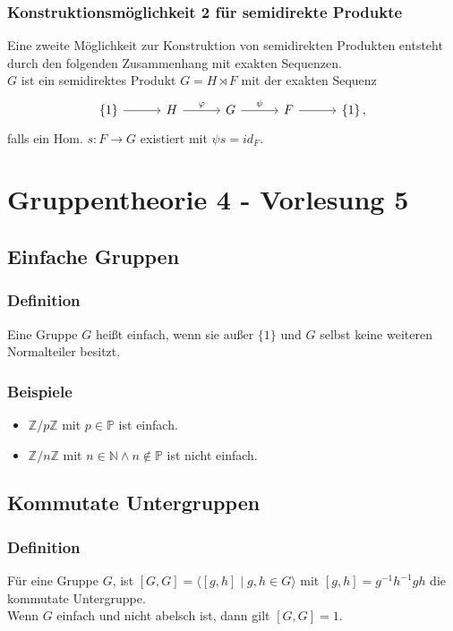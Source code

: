 \documentclass[12pt, german]{article}
\newcommand{\N}{\mathbb{N}}
\begin{document}
	\subsubsection{Konstruktionsmöglichkeit 2 für semidirekte Produkte}
	Eine zweite Möglichkeit zur Konstruktion von semidirekten Produkten entsteht durch den folgenden Zusammenhang mit exakten Sequenzen.\\
	$G$ ist ein semidirektes Produkt $G = H\rtimes F$ mit der exakten Sequenz 
	\begin{equation*}
		\begin{tikzcd}[column sep=2.5pc]
			\{1\} \arrow{r}{} & H \arrow{r}{\varphi} & G \arrow{r}{\psi} & F \arrow{r}{} & \{1\}\, ,
		\end{tikzcd}
	\end{equation*}
	falls ein Hom. $s: F \to G$ existiert  mit $\psi s = id_F$.
	
	\section{Gruppentheorie 4 - Vorlesung 5}
	\subsection{Einfache Gruppen}
	\subsubsection{Definition}
	Eine Gruppe $G$ hei\ss t einfach, wenn sie außer $\{1\}$ und $G$ selbst keine weiteren Normalteiler besitzt.
	
	\subsubsection{Beispiele}
	\begin{itemize}
		\item $\mathbb Z / p \mathbb Z$ mit $p \in \mathbb{P}$ ist einfach. 
		\item $\mathbb Z / n \mathbb Z$ mit $n \in \N \wedge n \notin \mathbb{P}$ ist nicht einfach. 
	\end{itemize}
	
	\subsection{Kommutate Untergruppen}
	\subsubsection{Definition}
	Für eine Gruppe $G$, ist $[G, G] = \langle [g, h] \mid g, h \in G \rangle$ mit $[g, h] = g^{-1}h^{-1}gh$ die kommutate Untergruppe. \\
	\newline
	Wenn $G$ einfach und nicht abelsch ist, dann gilt $[G, G] =1$. 
	
\end{document}
